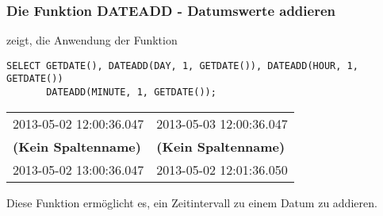 \subsubsection{Die Funktion DATEADD - Datumswerte addieren}
 zeigt, die Anwendung der Funktion 
\begin{lstlisting}[language=ms_sql,caption={Die Funktion \languagemssql{DATEADD} in SQL Server},label=sql03_22]
SELECT GETDATE(), DATEADD(DAY, 1, GETDATE()), DATEADD(HOUR, 1, GETDATE())
       DATEADD(MINUTE, 1, GETDATE());
          \end{lstlisting}
\begin{center}
    \begin{small}
        \tabletail{}
        \tablelasttail{}
        \begin{mssql}
            \begin{supertabular}{ll}
                2013-05-02 12:00:36.047 & 2013-05-03 12:00:36.047 \\
                \textbf{(Kein Spaltenname)} & \textbf{(Kein Spaltenname)} \\
                \cmidrule(l){1-1}\cmidrule(l){2-2}
                2013-05-02 13:00:36.047 & 2013-05-02 12:01:36.050 \\
            \end{supertabular}
        \end{mssql}
    \end{small}
\end{center}
Diese Funktion ermöglicht es, ein Zeitintervall zu einem Datum zu addieren.

